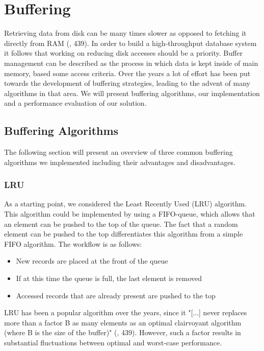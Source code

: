 \documentclass[a4paper, twocolumn,11pt]{article}
\begin{document}
\section{Buffering}
Retrieving data from disk can be many times slower as opposed to fetching it directly from RAM (\cite{Johnson}, 439). In order to build a high-throughput database system it follows that working on reducing disk accesses should be a priority. Buffer management can be described as the process in which data is kept inside of main memory, based some access criteria. Over the years a lot of effort has been put towards the development of buffering strategies, leading to the advent of many algorithms in that area. We will present buffering algorithms, our implementation and a performance evaluation of our solution.   

\subsection{Buffering Algorithms}
The following section will present an overview of three common buffering algorithms we implemented including their advantages and disadvantages. 

\subsubsection {LRU}
As a starting point, we considered the Least Recently Used (LRU) algorithm. This algorithm could be implemented by using a FIFO-queue, which allows that an element can be pushed to the top of the queue. The fact that a random element can be pushed to the top differentiates this algorithm from a simple FIFO algorithm. The workflow is as follows: 

\begin{itemize}
\item New records are placed at the front of the queue
\item If at this time the queue is full, the last element is removed
\item Accessed records that are already present are pushed to the top
\end{itemize}

LRU has been a popular algorithm over the years, since it "[...] never replaces more than a factor B as many elements as an optimal clairvoyant algorithm (where B is the size of the buffer)" (\cite{Johnson}, 439). However, such a factor results in substantial fluctuations between optimal and worst-case performance.
\end{document}
